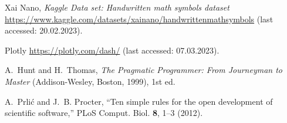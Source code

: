 \documentclass[@CLASSOPTIONS@]{tumarticle}
\begin{document}
\begin{thebibliography}{10}
  \newcommand{\enquote}[1]{``#1''}

  Xai Nano, \emph{Kaggle Data set: Handwritten math symbols dataset}
  \url{https://www.kaggle.com/datasets/xainano/handwrittenmathsymbols}
  (last accessed: 20.02.2023).

  Plotly \url{https://plotly.com/dash/}
  (last accessed: 07.03.2023).

  A.~Hunt and H.~Thomas, \emph{The Pragmatic Programmer: From Journeyman to
    Master} (Addison-Wesley, Boston, 1999), 1st ed.

  A.~Prli{\'c} and J.~B. Procter, \enquote{Ten simple rules for the open
    development of scientific software,} PLoS Comput. Biol. \textbf{8}, 1--3
  (2012).

\end{thebibliography}
\end{document}
